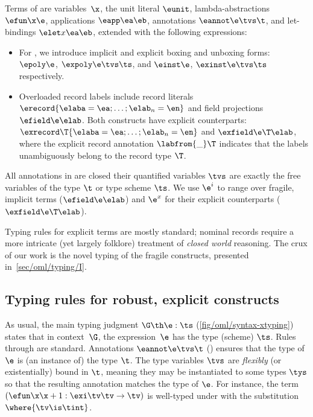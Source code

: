 \documentclass[acmsmall,screen,nonacm%
\Anonymous{,anonymous}{}%
\Final{}{,review}%
]{acmart}
\providecommand{\DIFadd}[1]{\protect\cbstart{\protect\color{blue}#1}\protect\cbend} %
\providecommand{\DIFdel}[1]{\protect\cbdelete{\protect\color{red}#1}\protect\cbdelete} %
\providecommand{\DIFaddbegin}{} %
\providecommand{\DIFaddend}{} %
\providecommand{\DIFdelbegin}{} %
\providecommand{\DIFdelend}{} %
\begin{document}
Terms of \OML are variables~$\x$, the unit literal $\eunit$,
lambda-abstractions $\efun \x \e$, applications $\eapp \ea \eb$, annotations
$\eannot \e \tvs \t$, and let-bindings $\elet x \ea \eb$, extended with the
following expressions:
\begin{itemize}

\item
  For \DIFdelbegin \DIFdel{polytypes}\DIFdelend \DIFaddbegin \polytypes\DIFaddend , we introduce implicit and explicit boxing and unboxing
  forms: $\epoly \e$, $\expoly \e \tvs \ts$, and $\einst \e$, $\exinst \e
  \tvs \ts$ respectively.

\item
  Overloaded record labels include record literals $\erecord { \elaba = \ea;
  \ldots; \elab_n = \en }$ and field projections $\efield \e \elab$. Both
  constructs have explicit counterparts: $\exrecord \T {\elaba = \ea;
  \ldots; \elab_n = \en }$ and $\exfield \e \T \elab$, where the explicit
    record annotation $\labfrom {\_} \T$ indicates that the labels unambiguously
  belong to the record type $\T$.

\end{itemize}
All annotations in \OML are closed \ie their \DIFaddbegin \DIFadd{existentially }\DIFaddend quantified
variables $\tvs$ are exactly the free variables of the type $\t$ or type
scheme $\ts$.
%
We use $\e^i$ to range over fragile, implicit terms (\eg $\efield \e \elab$) and
$\e^x$ for their explicit counterparts (\eg $\exfield \e \T \elab$).


Typing rules for explicit terms are mostly standard; nominal
records require a more intricate (yet largely folklore) treatment of
\emph{closed world} reasoning.
%
The crux of our work is the novel typing of the fragile constructs,
presented in~\cref {sec/oml/typing/I}.

\subsection{Typing rules for robust, explicit constructs}
\label{sec/oml/typing/X}


As usual, the main typing judgment $\G \th \e : \ts$
(\cref{fig/oml/syntax-xtyping}) states that in context~$\G$, the expression~$\e$
has the type (scheme) $\ts$.
%
Rules  through  are standard. Annotations $\eannot \e \tvs
\t$ () ensures that the type of $\e$ is (an instance of) the type
$\t$. The type variables $\tvs$ are \emph{flexibly} (or existentially) bound in
$\t$, meaning they may be instantiated to some types $\tys$ so that the
resulting annotation matches the type of $\e$. For instance, the term $(\efun
\x \x + 1 : \exi \tv \tv \to \tv)$ is well-typed under  with the
substitution $\where {\tv \is \tint}$.
\end{document}
